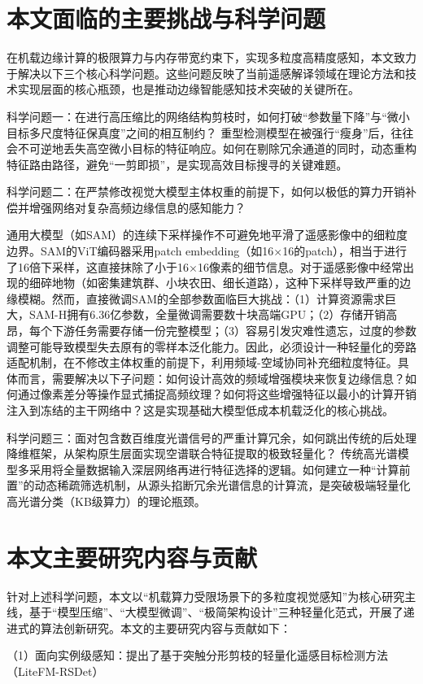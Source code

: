 \section{本文面临的主要挑战与科学问题}
在机载边缘计算的极限算力与内存带宽约束下，实现多粒度高精度感知，本文致力于解决以下三个核心科学问题。这些问题反映了当前遥感解译领域在理论方法和技术实现层面的核心瓶颈，也是推动边缘智能感知技术突破的关键所在。

科学问题一：在进行高压缩比的网络结构剪枝时，如何打破“参数量下降”与“微小目标多尺度特征保真度”之间的相互制约？
重型检测模型在被强行“瘦身”后，往往会不可逆地丢失高空微小目标的特征响应。如何在剔除冗余通道的同时，动态重构特征路由路径，避免“一剪即损”，是实现高效目标搜寻的关键难题。

科学问题二：在严禁修改视觉大模型主体权重的前提下，如何以极低的算力开销补偿并增强网络对复杂高频边缘信息的感知能力？

通用大模型（如SAM）的连续下采样操作不可避免地平滑了遥感影像中的细粒度边界。SAM的ViT编码器采用patch embedding（如16×16的patch），相当于进行了16倍下采样，这直接抹除了小于16×16像素的细节信息。对于遥感影像中经常出现的细碎地物（如密集建筑群、小块农田、细长道路），这种下采样导致严重的边缘模糊。然而，直接微调SAM的全部参数面临巨大挑战：（1）计算资源需求巨大，SAM-H拥有6.36亿参数，全量微调需要数十块高端GPU；（2）存储开销高昂，每个下游任务需要存储一份完整模型；（3）容易引发灾难性遗忘，过度的参数调整可能导致模型失去原有的零样本泛化能力。因此，必须设计一种轻量化的旁路适配机制，在不修改主体权重的前提下，利用频域-空域协同补充细粒度特征。具体而言，需要解决以下子问题：如何设计高效的频域增强模块来恢复边缘信息？如何通过像素差分等操作显式捕捉高频纹理？如何将这些增强特征以最小的计算开销注入到冻结的主干网络中？这是实现基础大模型低成本机载泛化的核心挑战。

科学问题三：面对包含数百维度光谱信号的严重计算冗余，如何跳出传统的后处理降维框架，从架构原生层面实现空谱联合特征提取的极致轻量化？
传统高光谱模型多采用将全量数据输入深层网络再进行特征选择的逻辑。如何建立一种“计算前置”的动态稀疏筛选机制，从源头掐断冗余光谱信息的计算流，是突破极端轻量化高光谱分类（KB级算力）的理论瓶颈。

\section{本文主要研究内容与贡献}
针对上述科学问题，本文以“机载算力受限场景下的多粒度视觉感知”为核心研究主线，基于“模型压缩”、“大模型微调”、“极简架构设计”三种轻量化范式，开展了递进式的算法创新研究。本文的主要研究内容与贡献如下：

（1）面向实例级感知：提出了基于突触分形剪枝的轻量化遥感目标检测方法（LiteFM-RSDet）

